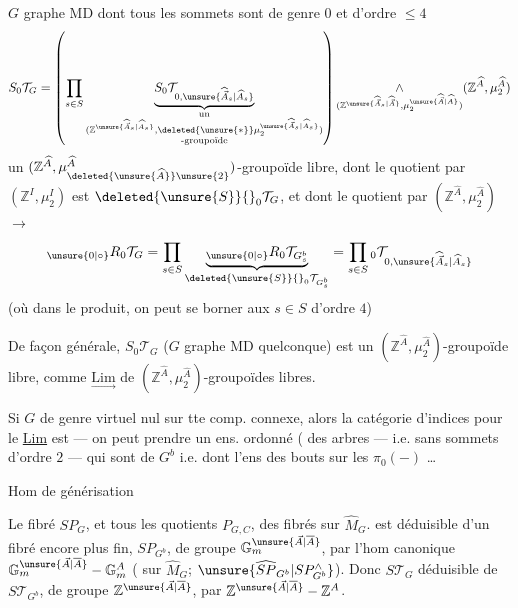 $G$ graphe MD dont tous les sommets sont de genre $0$ et d'ordre $\leq 4$ 
\[
S_0\mathcal{T}_G=
\left(\prod_{s\in S}
\underset{\substack{\text{un}\\
(\mathbb{Z}^{\unsure{\widehat{\vec A}_s|\widehat A_s}},\deleted{\unsure{\ast}}\mu_2^{\unsure{\widehat{\vec A}_s|\widehat A_s}})\\
\text{-groupoïde}}}{\underbrace{S_0\mathcal{T}_{0,\unsure{\widehat{\vec A}_s|\widehat A_s}}}}
\right)
\mathop{\wedge}_{(\mathbb{Z}^{\unsure{\widehat{\vec A}_s|\widehat{\vec A}}},\mu_2^{\unsure{\widehat{\vec A}|\widehat A}})}
(\mathbb{Z}^{\widehat A},\mu_2^{\widehat A})
\]
un $(\mathbb{Z}^{\widehat A},\mu_{\deleted{\unsure{\widehat A}}\unsure{2}}^{\widehat A})$-groupoïde libre, dont le quotient par $(\mathbb{Z}^{I},\mu_2^I)$ est $\deleted{\unsure{S}}{}_0\mathcal{T}_G$, et dont le quotient par $(\mathbb{Z}^{\widehat A},\mu_2^{\widehat A})$ $\longrightarrow$
\[
{}_{\unsure{0|\circ}}R_0\mathcal{T}_G
=\prod_{s\in S}\underset{\deleted{\unsure{S}}{}_0\mathcal{T}_{G_s^b}}{\underbrace{{}_{\unsure{0|\circ}}R_0\mathcal{T}_{G_s^b}}}
=\prod_{s\in S}{}_0\mathcal{T}_{0,\unsure{\widehat{\vec A}_s|\widehat A_s}}
\]
(où dans le produit, on peut se borner aux $s\in S$ d'ordre $4$)

De façon générale, $S_0\mathcal{T}_G$ ($G$ graphe MD quelconque) est un $(\mathbb{Z}^{\widehat A},\mu_2^{\widehat A})$-groupoïde libre, comme $\underset{\longrightarrow}{\mathrm{Lim}}$  de $(\mathbb{Z}^{\widehat A},\mu_2^{\widehat A})$-groupoïdes libres.

Si $G$ de genre virtuel nul sur tte comp. connexe, alors la catégorie d'indices pour le \uline{Lim} est 
--- on peut  prendre un ens. ordonné ( des arbres   --- i.e. sans sommets d'ordre $2$ --- qui sont de  $G^b$ i.e.  dont l'ens  des bouts sur les $\pi_0(-)$ \ldots


Hom de générisation

Le fibré $SP_G$, et tous les quotients $P_{G,C}$,  des fibrés sur $\widehat M_G$.  est déduisible d'un fibré encore plus fin, $SP_{G^b}$, de groupe $\mathbb{G}_m^{\unsure{\vec A|\overline A}}$, par l'hom canonique $\mathbb{G}_m^{\unsure{\vec A|\overline A}}-\mathbb{G}_m^A$ ( sur $\widehat M_G$;  $\unsure{\widehat{SP}_{G^b}|SP^{\wedge}_{G^b}}$). Donc $S\mathcal{T}_G$ déduisible de $S\mathcal{T}_{G^b}$, de groupe $\mathbb{Z}^{\unsure{\vec A|\overline A}}$, par $\mathbb{Z}^{\unsure{\vec A|\overline A}}-\mathbb{Z}^A$.

